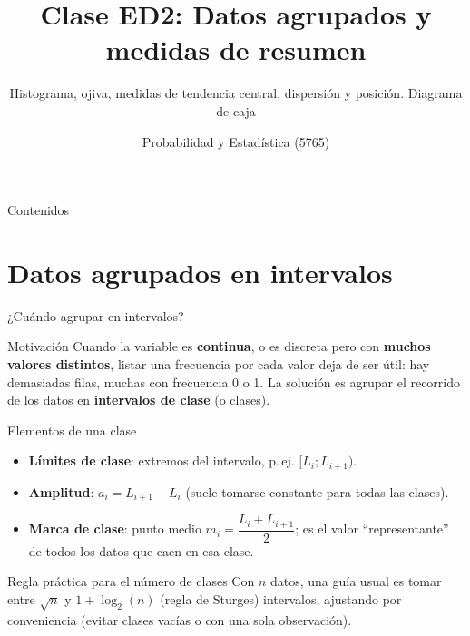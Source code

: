 \documentclass[aspectratio=169,11pt]{beamer}
\title[Prob. y Estadística]{Clase ED2: Datos agrupados y medidas de resumen}
\subtitle{Histograma, ojiva, medidas de tendencia central, dispersión y posición. Diagrama de caja}
\institute[UNS]{Universidad Nacional del Sur \\ Departamento de Matemática}
\author{Probabilidad y Estadística (5765)}
\date{}
\begin{document}
\begin{frame}
\titlepage
\end{frame}

\begin{frame}{Contenidos}
\tableofcontents
\end{frame}

\section{Datos agrupados en intervalos}

\begin{frame}{¿Cuándo agrupar en intervalos?}
\begin{alertblock}{Motivación}
Cuando la variable es \textbf{continua}, o es discreta pero con \textbf{muchos valores distintos}, listar una frecuencia por cada valor deja de ser útil: hay demasiadas filas, muchas con frecuencia 0 o 1. La solución es agrupar el recorrido de los datos en \textbf{intervalos de clase} (o clases).
\end{alertblock}
\begin{block}{Elementos de una clase}
\begin{itemize}
\item \textbf{Límites de clase}: extremos del intervalo, p.\,ej. $[L_i;L_{i+1})$.
\item \textbf{Amplitud}: $a_i = L_{i+1}-L_i$ (suele tomarse constante para todas las clases).
\item \textbf{Marca de clase}: punto medio $m_i = \dfrac{L_i+L_{i+1}}{2}$; es el valor ``representante'' de todos los datos que caen en esa clase.
\end{itemize}
\end{block}
\begin{block}{Regla práctica para el número de clases}
Con $n$ datos, una guía usual es tomar entre $\sqrt{n}$ y $1+\log_2(n)$ (regla de Sturges) intervalos, ajustando por conveniencia (evitar clases vacías o con una sola observación).
\end{block}
\end{frame}
\end{document}
